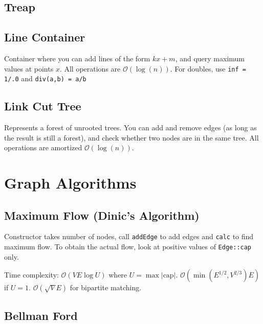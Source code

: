 \documentclass{article}
\begin{document}
\subsection*{Treap}


\subsection*{Line Container}
Container where you can add lines of the form $kx + m$, and query maximum values at points $x$.
All operations are $\mathcal{O}(\log(n))$. For doubles, use \lstinline{inf = 1/.0} and \lstinline{div(a,b) = a/b}


\newpage

\subsection*{Link Cut Tree}
Represents a forest of unrooted trees. You can add and remove edges (as long as the result is still a forest), and check whether two nodes are in the same tree.
All operations are amortized $\mathcal{O}(\log(n))$.


\section*{Graph Algorithms}
%

\subsection*{Maximum Flow (Dinic's Algorithm)}

Constructor takes number of nodes, call \lstinline{addEdge} to add edges and \lstinline{calc} to find maximum flow.
To obtain the actual flow, look at positive values of \lstinline{Edge::cap} only.

Time complexity: $\mathcal{O}(VE\log U)$ where $U = \max |\text{cap}|$.
$\mathcal{O}(\min(E^{1/2}, V^{2/3})E)$ if $U = 1$.
$\mathcal{O}(\sqrt{V}E)$ for bipartite matching.



\subsection*{Bellman Ford}
\end{document}
